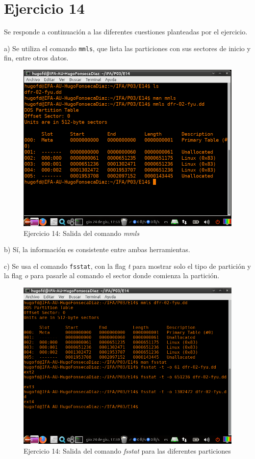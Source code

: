 \documentclass[11pt]{article}
\begin{document}
\section{Ejercicio 14}
Se responde a continuación a las diferentes cuestiones planteadas por el ejercicio.

a) Se utiliza el comando \verb|mmls|, que lista las particiones con sus sectores de inicio y fin, entre otros datos.

\begin{figure}[H]
    \caption{Ejercicio 14: Salida del comando \textit{mmls}}
    \centering
    \includegraphics[scale=0.7]{e14-1.png}
\end{figure}

b) Sí, la información es consistente entre ambas herramientas.

c) Se usa el comando \verb|fsstat|, con la flag \textit{t} para mostrar solo el tipo de partición y la flag \textit{o} para pasarle al comando el sector donde comienza la partición.

\begin{figure}[H]
    \caption{Ejercicio 14: Salida del comando \textit{fsstat} para las diferentes particiones}
    \centering
    \includegraphics[scale=0.7]{e14-2.png}
\end{figure}
\end{document}
